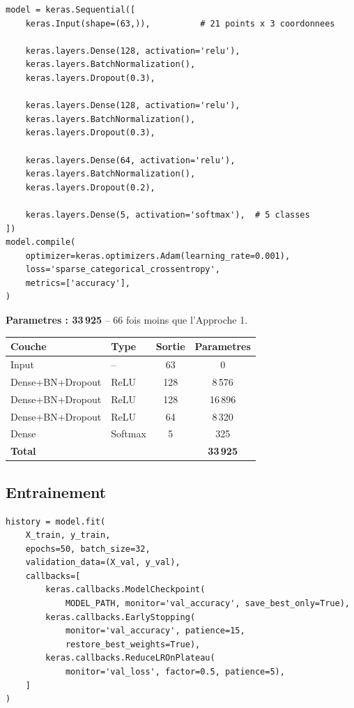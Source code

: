 \documentclass[12pt,a4paper]{article}
\begin{document}
\begin{lstlisting}[caption={Reseau dense sur landmarks (4\_entrainer\_landmarks.py).}]
model = keras.Sequential([
    keras.Input(shape=(63,)),          # 21 points x 3 coordonnees

    keras.layers.Dense(128, activation='relu'),
    keras.layers.BatchNormalization(),
    keras.layers.Dropout(0.3),

    keras.layers.Dense(128, activation='relu'),
    keras.layers.BatchNormalization(),
    keras.layers.Dropout(0.3),

    keras.layers.Dense(64, activation='relu'),
    keras.layers.BatchNormalization(),
    keras.layers.Dropout(0.2),

    keras.layers.Dense(5, activation='softmax'),  # 5 classes
])
model.compile(
    optimizer=keras.optimizers.Adam(learning_rate=0.001),
    loss='sparse_categorical_crossentropy',
    metrics=['accuracy'],
)
\end{lstlisting}

\textbf{Parametres : 33\,925} -- 66 fois moins que l'Approche 1.

\begin{center}
\begin{tabular}{llcc}
\toprule
Couche & Type & Sortie & Parametres \\
\midrule
Input & -- & 63 & 0 \\
Dense+BN+Dropout & ReLU & 128 & 8\,576 \\
Dense+BN+Dropout & ReLU & 128 & 16\,896 \\
Dense+BN+Dropout & ReLU & 64 & 8\,320 \\
Dense & Softmax & 5 & 325 \\
\midrule
\textbf{Total} & & & \textbf{33\,925} \\
\bottomrule
\end{tabular}
\end{center}

\subsection{Entrainement}

\begin{lstlisting}[caption={Entrainement avec callbacks.}]
history = model.fit(
    X_train, y_train,
    epochs=50, batch_size=32,
    validation_data=(X_val, y_val),
    callbacks=[
        keras.callbacks.ModelCheckpoint(
            MODEL_PATH, monitor='val_accuracy', save_best_only=True),
        keras.callbacks.EarlyStopping(
            monitor='val_accuracy', patience=15,
            restore_best_weights=True),
        keras.callbacks.ReduceLROnPlateau(
            monitor='val_loss', factor=0.5, patience=5),
    ]
)
\end{lstlisting}
\end{document}
